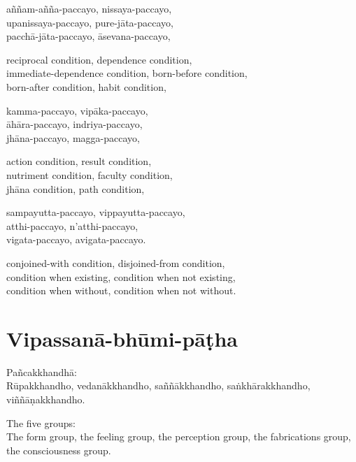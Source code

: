 aññam-añña-paccayo, nissaya-paccayo,\\
upanissaya-paccayo, pure-jāta-paccayo,\\
pacchā-jāta-paccayo, āsevana-paccayo,

\begin{english}
  reciprocal condition, dependence condition,\\
  immediate-dependence condition, born-before condition,\\
  born-after condition, habit condition,
\end{english}

kamma-paccayo, vipāka-paccayo,\\
āhāra-paccayo, indriya-paccayo,\\
jhāna-paccayo, magga-paccayo,

\begin{english}
  action condition, result condition,\\
  nutriment condition, faculty condition,\\
  jhāna condition, path condition,
\end{english}

sampayutta-paccayo, vippayutta-paccayo,\\
atthi-paccayo, n'atthi-paccayo,\\
vigata-paccayo, avigata-paccayo.

\begin{english}
  conjoined-with condition, disjoined-from condition,\\
  condition when existing, condition when not existing,\\
  condition when without, condition when not without.
\end{english}


\section{Vipassanā-bhūmi-pāṭha}



Pañcakkhandhā:\\
Rūpakkhandho, vedanākkhandho, saññākkhandho, saṅkhārakkhandho, viññāṇakkhandho.

\begin{english}
  The five groups:\\
  The form group, the feeling group, the perception group, the fabrications
  group, the consciousness group.
\end{english}

